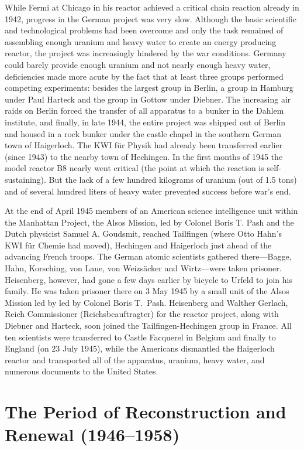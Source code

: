 \documentclass{article}
\begin{document}
While Fermi at Chicago in his reactor achieved a critical chain reaction already in 1942, progress in the German project was very slow. Although the basic scientific and technological problems had been overcome and only the task remained of assembling enough uranium and heavy water to create an energy producing reactor, the project was increasingly hindered by the war conditions. Germany could barely provide enough uranium and not nearly enough heavy water, deficiencies made more acute by the fact that at least three groups performed competing experiments: besides the largest group in Berlin, a group in Hamburg under Paul Harteck and the group in Gottow under Diebner. The increasing air raids on Berlin forced the transfer of all apparatus to a bunker in the Dahlem institute, and finally, in late 1944, the entire project was shipped out of Berlin and housed in a rock bunker under the castle chapel in the southern German town of Haigerloch. The KWI für Physik had already been transferred earlier (since 1943) to the nearby town of Hechingen. In the first months of 1945 the model reactor B8 nearly went critical (the point at which the reaction is self-sustaining). But the lack of a few hundred kilograms of uranium (out of 1.5 tons) and of several hundred liters of heavy water prevented success before war's end.

At the end of April 1945 members of an American science intelligence unit within the Manhattan Project, the Alsos Mission, led by Colonel Boris T. Pash and the Dutch physicist Samuel A. Goudsmit, reached Tailfingen (where Otto Hahn's KWI für Chemie had moved), Hechingen and Haigerloch just ahead of the advancing French troops. The German atomic scientists gathered there---Bagge, Hahn, Korsching, von Laue, von Weizsäcker and Wirtz---were taken prisoner. Heisenberg, however, had gone a few days earlier by bicycle to Urfeld to join his family. He was taken prisoner there on 3 May 1945 by a small unit of the Alsos Mission led by led by Colonel Boris T.~Pash. Heisenberg and Walther Gerlach, Reich Commissioner (Reichsbeauftragter) for the reactor project, along with Diebner and Harteck, soon joined the Tailfingen-Hechingen group in France. All ten scientists were transferred to Castle Facquerel in Belgium and finally to England (on 23 July 1945), while the Americans dismantled the Haigerloch reactor and transported all of the apparatus, uranium, heavy water, and numerous documents to the United States.

\section{The Period of Reconstruction and Renewal (1946--1958)}
\end{document}
